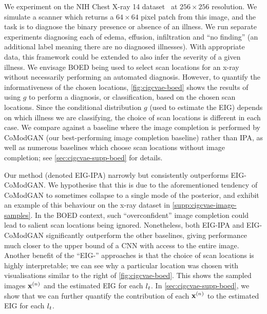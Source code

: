 We experiment on the NIH Chest X-ray 14 dataset~\citep{wang2017chestx} at
$256\times256$ resolution.
%
%
%
We simulate a scanner which returns a $64 \times 64$ pixel patch from this
image, and the task is to diagnose the binary presence or absence of an illness.
We run separate experiments diagnosing each of edema, effusion, infiltration and
``no finding'' (an additional label meaning there are no diagnosed illnesses).
With appropriate data, this framework could be extended to also infer the
severity of a given illness.
%
We envisage BOED being used to select scan locations for an x-ray without
necessarily performing an automated diagnosis. However, to quantify the
informativeness of the chosen locations, \cref{fig:cigcvae-boed} shows the results of
using $g$ to perform a diagnosis, or classification, based on the chosen scan
locations.
%
Since the conditional distribution $g$ (used to estimate the EIG) depends on
which illness we are classifying, the choice of scan locations is different in
each case.
%
We compare against a baseline where the image completion is performed by
CoModGAN (our best-performing image completion baseline) rather than IPA, as
well as numerous baselines which choose scan locations without image
completion; see \cref{sec:cigcvae-supp-boed} for details.

Our method (denoted EIG-IPA) narrowly but consistently outperforms EIG-CoModGAN.
%
%
We hypothesise that this is due to the aforementioned tendency of CoModGAN to
sometimes collapse to a single mode of the posterior, and exhibit an example of
this behaviour on the x-ray dataset in \cref{supp:cigcvae-image-samples}. In the BOED
context, such ``overconfident'' image completion could lead to salient scan
locations being ignored. Nonetheless, both EIG-IPA and EIG-CoModGAN
significantly outperform the other baselines, giving performance much closer to
the upper bound of a CNN with access to the entire image. Another benefit of the
``EIG-'' approaches is that the choice of scan locations is highly
interpretable; we can see why a particular location was chosen with
visualisations similar to the right of \cref{fig:cigcvae-boed}. This shows the sampled
images $\mathbf{x}{}^{(n)}$ and the estimated EIG for each $l{}_t$. In \cref{sec:cigcvae-supp-boed}, we
show that we can further quantify the contribution of each $\mathbf{x}{}^{(n)}$ to the
estimated EIG for each $l{}_t$.


